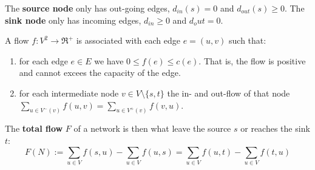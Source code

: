 The \textbf{source node} only has out-going edges, $d_{in}(s) = 0$ and $d_{out}(s) \geq 0$. The \textbf{sink node} only has incoming edges, $d_{in} \geq 0$ and $d_out = 0$.

\begin{definition}[Flow]
	A flow $f : V^2 \longrightarrow \Re^{+}$ is associated with each edge $e = (u,v)$ such that:
	\begin{enumerate}
		\item for each edge $e \in E$ we have $0 \leq f(e) \leq c(e)$. That is, the flow is positive and cannot excees the capacity of the edge.
		
		\item for each intermediate node $v \in V\setminus \{s,t\}$ the in- and out-flow of that node $\sum_{u \in V^-(v)} f(u,v) = \sum_{u \in V^+(v)} f(v,u)$.
	\end{enumerate}
\end{definition}

The \textbf{total flow} $F$ of a network is then what leave the source $s$ or reaches the sink $t$:
\begin{equation}
F(N) := \sum_{u \in V} f(s,u) - \sum_{u \in V}f(u,s) = \sum_{u \in V} f(u,t) - \sum_{u \in V}f(t,u)
\end{equation}

